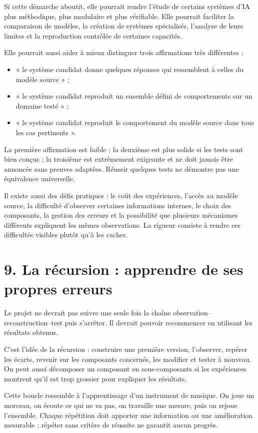 \documentclass[11pt,a4paper]{article}
\begin{document}
Si cette démarche aboutit, elle pourrait rendre l'étude de certains systèmes d'IA plus méthodique, plus modulaire et plus vérifiable. Elle pourrait faciliter la comparaison de modèles, la création de systèmes spécialisés, l'analyse de leurs limites et la reproduction contrôlée de certaines capacités.

Elle pourrait aussi aider à mieux distinguer trois affirmations très différentes :
\begin{itemize}[leftmargin=1.4em]
  \item « le système candidat donne quelques réponses qui ressemblent à celles du modèle source » ;
  \item « le système candidat reproduit un ensemble défini de comportements sur un domaine testé » ;
  \item « le système candidat reproduit le comportement du modèle source dans tous les cas pertinents ».
\end{itemize}

La première affirmation est faible ; la deuxième est plus solide si les tests sont bien conçus ; la troisième est extrêmement exigeante et ne doit jamais être annoncée sans preuves adaptées. Réussir quelques tests ne démontre pas une équivalence universelle.

Il existe aussi des défis pratiques : le coût des expériences, l'accès au modèle source, la difficulté d'observer certaines informations internes, le choix des composants, la gestion des erreurs et la possibilité que plusieurs mécanismes différents expliquent les mêmes observations. La rigueur consiste à rendre ces difficultés visibles plutôt qu'à les cacher.

\section*{9. La récursion : apprendre de ses propres erreurs}

Le projet ne devrait pas suivre une seule fois la chaîne observation--reconstruction--test puis s'arrêter. Il devrait pouvoir recommencer en utilisant les résultats obtenus.

C'est l'idée de la récursion : construire une première version, l'observer, repérer les écarts, revenir sur les composants concernés, les modifier et tester à nouveau. On peut aussi décomposer un composant en sous-composants si les expériences montrent qu'il est trop grossier pour expliquer les résultats.

Cette boucle ressemble à l'apprentissage d'un instrument de musique. On joue un morceau, on écoute ce qui ne va pas, on travaille une mesure, puis on rejoue l'ensemble. Chaque répétition doit apporter une information ou une amélioration mesurable ; répéter sans critère de réussite ne garantit aucun progrès.
\end{document}
